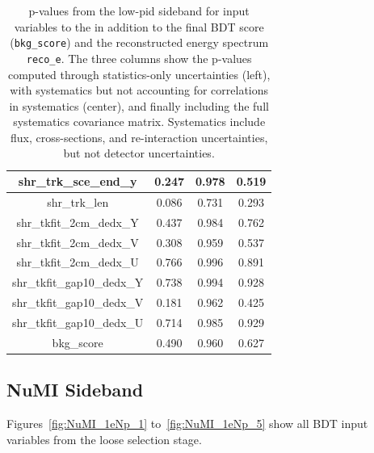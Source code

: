 \begin{table}[H]
\begin{tabular}{| c | c | c | c | }
shr\_trk\_sce\_end\_y & 0.247 & 0.978 & 0.519 \\ \hline
shr\_trk\_len & 0.086 & 0.731 & 0.293 \\ \hline
shr\_tkfit\_2cm\_dedx\_Y & 0.437 & 0.984 & 0.762 \\ \hline
shr\_tkfit\_2cm\_dedx\_V & 0.308 & 0.959 & 0.537 \\ \hline
shr\_tkfit\_2cm\_dedx\_U & 0.766 & 0.996 & 0.891 \\ \hline
shr\_tkfit\_gap10\_dedx\_Y & 0.738 & 0.994 & 0.928 \\ \hline
shr\_tkfit\_gap10\_dedx\_V & 0.181 & 0.962 & 0.425 \\ \hline
shr\_tkfit\_gap10\_dedx\_U & 0.714 & 0.985 & 0.929 \\ \hline
bkg\_score & 0.490 & 0.960 & 0.627 \\ \hline
 \end{tabular}
 \caption{\label{tab:1e0p:LPID:pvalues}p-values from the low-pid \zpsel sideband for input variables to the \zpsel in addition to the final BDT score (\texttt{bkg\_score}) and the reconstructed energy spectrum \texttt{reco\_e}. The three columns show the p-values computed through statistics-only uncertainties (left), with systematics but not accounting for correlations in systematics (center), and finally including the full systematics covariance matrix. Systematics include flux, cross-sections, and re-interaction uncertainties, but not detector uncertainties.}
\end{table}


\subsection{NuMI \npsel Sideband}
\label{app:sideband:1eNpNuMI}
Figures~\ref{fig:NuMI_1eNp_1} to~\ref{fig:NuMI_1eNp_5} show all BDT input variables from the   loose selection stage.

